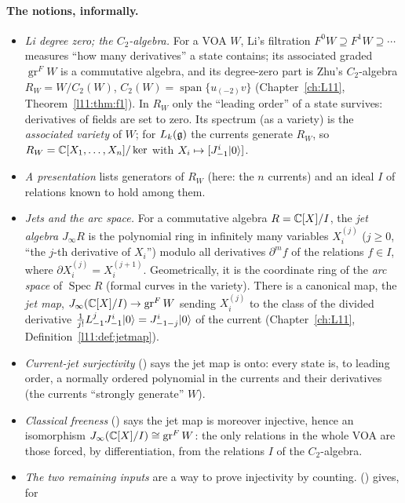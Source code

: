 \paragraph{The notions, informally.}
\begin{itemize}
\item \emph{Li degree zero; the $C_2$-algebra.} For a VOA $W$, Li's filtration $F^0W\supseteq F^1W\supseteq\cdots$ measures ``how many
  derivatives'' a state contains; its associated graded $\operatorname{gr}^FW$ is a commutative algebra, and its degree-zero part is Zhu's
  $C_2$-algebra $R_W=W/C_2(W)$, $C_2(W)=\operatorname{span}\{u_{(-2)}v\}$ (Chapter~\ref{ch:L11}, Theorem~\ref{l11:thm:f1}). In $R_W$ only the
  ``leading order'' of a state survives: derivatives of fields are set to zero. Its spectrum (as a variety) is the \emph{associated
  variety} of $W$; for $L_k(\mathfrak g)$ the currents generate $R_W$, so $R_W={\mathbb{C}}[X_1,\dots,X_n]/\ker$ with $X_i\mapsto[J^i_{-1}|0\rangle]$.
\item \emph{A presentation} lists generators of $R_W$ (here: the $n$ currents) and an ideal $I$ of relations known to hold among them.
\item \emph{Jets and the arc space.} For a commutative algebra $R={\mathbb{C}}[X]/I$, the \emph{jet algebra} $J_\infty R$ is the polynomial ring in
  infinitely many variables $X_i^{(j)}$ ($j\ge0$, ``the $j$-th derivative of $X_i$'') modulo all derivatives $\partial^mf$ of the relations $f\in I$,
  where $\partial X_i^{(j)}=X_i^{(j+1)}$. Geometrically, it is the coordinate ring of the \emph{arc space} of $\operatorname{Spec}R$ (formal
  curves in the variety). There is a canonical map, the \emph{jet map}, $J_\infty({\mathbb{C}}[X]/I)\to\operatorname{gr}^FW$ sending $X_i^{(j)}$ to the
  class of the divided derivative $\frac1{j!}L_{-1}^jJ^i_{-1}|0\rangle=J^i_{-1-j}|0\rangle$ of the current (Chapter~\ref{ch:L11}, Definition~\ref{l11:def:jetmap}).
\item \emph{Current-jet surjectivity} () says the jet map is onto: every state is, to leading order, a
  normally ordered polynomial in the currents and their derivatives (the currents ``strongly generate'' $W$).
\item \emph{Classical freeness} () says the jet map is moreover injective, hence an isomorphism
  $J_\infty({\mathbb{C}}[X]/I)\cong\operatorname{gr}^FW$: the only relations in the whole VOA are those forced, by differentiation, from the relations $I$
  of the $C_2$-algebra.
\item \emph{The two remaining inputs} are a way to prove injectivity by counting.  () gives, for

\end{itemize}
